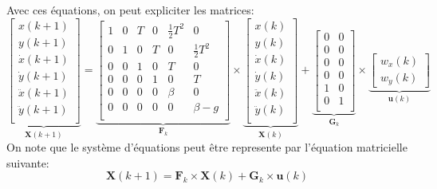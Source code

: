 \documentclass{article}
\begin{document}
\noindent Avec ces équations, on peut expliciter les matrices:
\begin{equation}
    \underbrace{\begin{bmatrix}
        x(k+1)\\
        y(k+1)\\
        \dot{x}(k+1)\\
        \dot{y}(k+1)\\
        \ddot{x}(k+1)\\
        \ddot{y}(k+1)\\
    \end{bmatrix}}_{\mathbf{X}(k+1)}
    = 
    \underbrace{\begin{bmatrix}
        1 & 0 & T & 0 & \frac{1}{2}T^2 & 0\\
        0 & 1 & 0 & T & 0              & \frac{1}{2}T^2\\
        0 & 0 & 1 & 0 & T              & 0 \\
        0 & 0 & 0 & 1 & 0              & T \\
        0 & 0 & 0 & 0 & \beta          & 0 \\
        0 & 0 & 0 & 0 & 0              & \beta - g\\
    \end{bmatrix}}_{\mathbf{F}_{k}}
    \times
    \underbrace{\begin{bmatrix}
        x(k)\\
        y(k)\\
        \dot{x}(k)\\
        \dot{y}(k)\\
        \ddot{x}(k)\\
        \ddot{y}(k)\\
    \end{bmatrix}}_{\mathbf{X}(k)}
    + 
    \underbrace{\begin{bmatrix}
        0 & 0 \\
        0 & 0 \\
        0 & 0 \\
        0 & 0 \\
        1 & 0 \\
        0 & 1 \\
    \end{bmatrix}}_{\mathbf{G}_{k}}
    \times
    \underbrace{\begin{bmatrix}
        w_{x}(k)\\
        w_{y}(k)
    \end{bmatrix}}_{\mathbf{u}(k)}
\end{equation}
On note que le système d'équations peut être represente par l'équation matricielle suivante:
\begin{equation}
    \boxed{\mathbf{X}(k+1) = \mathbf{F}_{k} \times \mathbf{X}(k) + \mathbf{G}_{k} \times \mathbf{u}(k)}
\end{equation}
\end{document}
